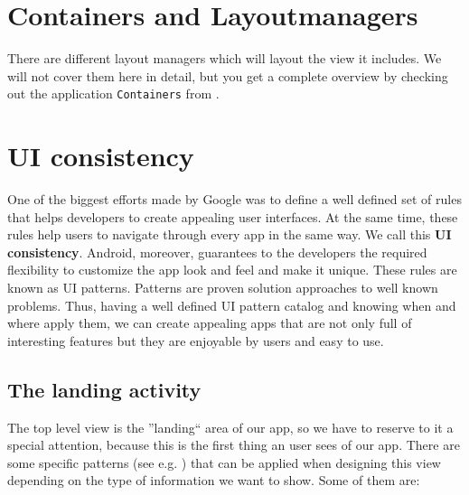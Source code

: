 \section{Containers and Layoutmanagers}
There are different layout managers which will layout the view it includes. We will not cover them here in detail, but you get a complete overview by checking out the application \texttt{Containers} from \cite{murphymarkl.2017}.




\section{UI consistency}
One of the biggest efforts made by Google was to define a well defined set of rules that helps developers to create appealing user
interfaces. At the same time, these rules help users to navigate through every app in the same way. We call this\textbf{ UI consistency}.
Android, moreover, guarantees to the developers the required flexibility to customize the app look and feel and make it unique.
These rules are known as UI patterns. Patterns are proven solution approaches to well known problems. Thus, having a well
defined UI pattern catalog and knowing when and where apply them, we can create appealing apps that are not only full of
interesting features but they are enjoyable by users and easy to use.

\subsection{The landing activity}
The top level view is the ''landing`` area of our app, so we have to reserve to it a special attention, because this is the first
thing an user sees of our app. There are some specific patterns (see e.g. \cite{Google2017}) that can be applied when designing this view depending on the type of information we want to show. Some of them are:

